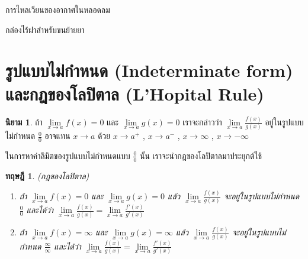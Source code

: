 \documentclass[
]{book}
\newtheorem{theorem}{ทฤษฎี}[chapter]
\theoremstyle{definition}
\newtheorem{definition}{นิยาม}[chapter]
\theoremstyle{definition}
\theoremstyle{definition}
\theoremstyle{definition}
\theoremstyle{remark}
\begin{document}
การไหลเวียนของอากาศในหลอดลม

กล่องไร้ฝาสำหรับขนย้ายยา



\section{รูปแบบไม่กำหนด (Indeterminate form) และกฎของโลปิตาล (L'Hopital Rule)}\label{uxe23uxe1buxe41uxe1auxe1auxe44uxe21uxe01uxe33uxe2buxe19uxe14-indeterminate-form-uxe41uxe25uxe30uxe01uxe0euxe02uxe2duxe07uxe42uxe25uxe1buxe15uxe32uxe25-lhopital-rule}

\begin{definition}
ถ้า \(\mathop {\lim }\limits_{x\to a} f(x)=0\) และ \(\displaystyle \mathop
{\lim
}\limits_{x\to a} g(x)=0\) เราจะกล่าวว่า \(\displaystyle \mathop {\lim
}\limits_{x\to a}
\frac{f(x)}{g(x)}\) อยู่ในรูปแบบไม่กำหนด \(\displaystyle \frac{0}{0}\) อาจแทน
\(x\to a\) ด้วย \(x\to a^+\) , \(x\to a^-\) , \(x\to \infty\) , \(x\to -\infty\)
\end{definition}

ในการหาค่าลิมิตของรูปแบบไม่กำหนดแบบ \(\displaystyle \frac{0}{0}\) นั้น
เราจะนำกฎของโลปิตาลมาประยุกต์ใช้

\begin{theorem}

(กฎของโลปิตาล)\\

\begin{enumerate}
\def\labelenumi{\arabic{enumi}.}
\item
  ถ้า \(\mathop {\lim }\limits_{x\to a} f(x)=0\) และ \(\mathop {\lim
      }\limits_{x\to a} g(x)=0\) แล้ว
  \(\displaystyle \mathop {\lim }\limits_{x\to
      a}
      \frac{f(x)}{g(x)}\) จะอยู่ในรูปแบบไม่กำหนด
  \(\displaystyle \frac{0}{0}\) และได้ว่า
  \(\displaystyle \mathop {\lim }\limits_{x\to a}
      \frac{f(x)}{g(x)}=\mathop {\lim
      }\limits_{x\to a} \frac{{f}'(x)}{{g}'(x)}\)\\
\item
  ถ้า \(\mathop {\lim }\limits_{x\to a} f(x)=\infty\) และ \(\mathop {\lim
      }\limits_{x\to a} g(x)=\infty\) แล้ว \(\displaystyle \mathop {\lim
      }\limits_{x\to a}
      \frac{f(x)}{g(x)}\) จะอยู่ในรูปแบบไม่กำหนด
  \(\displaystyle \frac{\infty
      }{\infty }\) และได้ว่า
  \(\displaystyle \mathop {\lim }\limits_{x\to a}
      \frac{f(x)}{g(x)}=\mathop {\lim
      }\limits_{x\to a} \frac{{f}'(x)}{{g}'(x)}\)
\end{enumerate}

\end{theorem}
\end{document}
